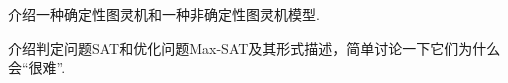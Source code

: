 \documentclass[a4paper, justified]{tufte-handout}
\begin{document}
\beginoptional



\beginot
\begin{ot}	
	介绍一种确定性图灵机和一种非确定性图灵机模型.
\end{ot}


\begin{ot}[SAT]	
介绍判定问题SAT和优化问题Max-SAT及其形式描述，简单讨论一下它们为什么会``很难''.
\end{ot}




% 




\beginfb

% 
% 
\end{document}

